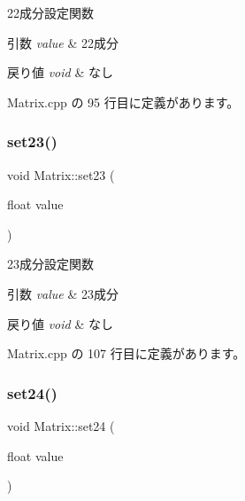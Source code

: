 22成分設定関数 


\begin{DoxyParams}{引数}
{\em value} & 22成分 \\
\hline
\end{DoxyParams}

\begin{DoxyRetVals}{戻り値}
{\em void} & なし \\
\hline
\end{DoxyRetVals}


 Matrix.\+cpp の 95 行目に定義があります。

\mbox{\label{class_matrix_a765ef911f6d3345b05f6bda8f2330595}} 
\subsubsection{\texorpdfstring{set23()}{set23()}}
{\footnotesize\ttfamily void Matrix\+::set23 (\begin{DoxyParamCaption}\item[{float}]{value }\end{DoxyParamCaption})}



23成分設定関数 


\begin{DoxyParams}{引数}
{\em value} & 23成分 \\
\hline
\end{DoxyParams}

\begin{DoxyRetVals}{戻り値}
{\em void} & なし \\
\hline
\end{DoxyRetVals}


 Matrix.\+cpp の 107 行目に定義があります。

\mbox{\label{class_matrix_a99120cc734398118f0708daa95ca545b}} 
\subsubsection{\texorpdfstring{set24()}{set24()}}
{\footnotesize\ttfamily void Matrix\+::set24 (\begin{DoxyParamCaption}\item[{float}]{value }\end{DoxyParamCaption})}



